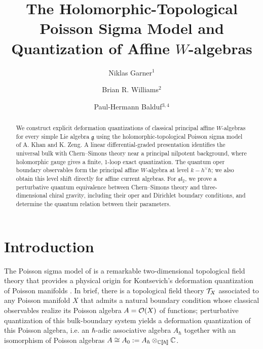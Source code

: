 \documentclass[11pt]{amsart}
\title{The Holomorphic-Topological Poisson Sigma Model and Quantization of Affine $W$-algebras}
\author{Niklas Garner${}^1$\orcidlink{0000-0002-4646-2599}}
\author{Brian R. Williams${}^2$\orcidlink{0000-0001-9641-861X}}
\author{Paul-Hermann Balduf${}^{3,4}$\orcidlink{0000-0003-4475-3031}}
\numberwithin{equation}{section}
\numberwithin{figure}{section}
\numberwithin{table}{section}
\begin{document}
\begin{abstract}
	We construct explicit deformation quantizations of classical principal affine $W$-algebras for every simple Lie algebra $\mathfrak g$ using the holomorphic-topological Poisson sigma model of A. Khan and K. Zeng.
	A linear differential-graded presentation identifies the universal bulk with Chern--Simons theory near a principal nilpotent background, where holomorphic gauge gives a finite, 1-loop exact quantization.
	The quantum oper boundary observables form the principal affine $W$-algebra at level $k-h^\vee\hbar$; we also obtain this level shift directly for affine current algebras.
	For $\mathfrak{sl}_2$, we prove a perturbative quantum equivalence between Chern--Simons theory and three-dimensional chiral gravity, including their oper and Dirichlet boundary conditions, and determine the quantum relation between their parameters.
\end{abstract}

\maketitle
\tableofcontents

\section{Introduction}\label{sec:Introduction}

The Poisson sigma model of \cite{Ikeda:1993fh, Schaller:1994es} is a remarkable two-dimensional topological field theory that provides a physical origin for Kontsevich's deformation quantization of Poisson manifolds \cite{Kontsevich:1997vb, Cattaneo:1999fm}.
In brief, there is a topological field theory ${\mathcal T}_X$ associated to any Poisson manifold $X$ that admits a natural boundary condition whose classical observables realize its Poisson algebra $A = {\mathcal O}(X)$ of functions; perturbative quantization of this bulk-boundary system yields a deformation quantization of this Poisson algebra, i.e. an $\hbar$-adic associative algebra $A_\hbar$ together with an isomorphism of Poisson algebras $A \cong A_0 := A_\hbar \otimes_{{\mathbb C}[\![\hbar]\!]} {\mathbb C}$.
\end{document}
